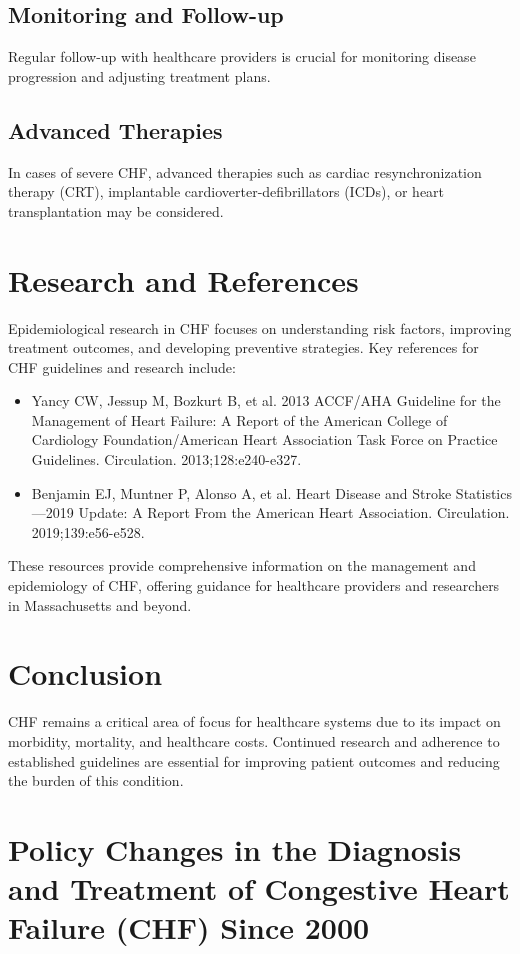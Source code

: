 \documentclass{article}
\begin{document}
\subsection{Monitoring and Follow-up}
Regular follow-up with healthcare providers is crucial for monitoring disease progression and adjusting treatment plans.

\subsection{Advanced Therapies}
In cases of severe CHF, advanced therapies such as cardiac resynchronization therapy (CRT), implantable cardioverter-defibrillators (ICDs), or heart transplantation may be considered.

\section{Research and References}
Epidemiological research in CHF focuses on understanding risk factors, improving treatment outcomes, and developing preventive strategies. Key references for CHF guidelines and research include:

\begin{itemize}
    \item Yancy CW, Jessup M, Bozkurt B, et al. 2013 ACCF/AHA Guideline for the Management of Heart Failure: A Report of the American College of Cardiology Foundation/American Heart Association Task Force on Practice Guidelines. Circulation. 2013;128:e240-e327.
    \item Benjamin EJ, Muntner P, Alonso A, et al. Heart Disease and Stroke Statistics—2019 Update: A Report From the American Heart Association. Circulation. 2019;139:e56-e528.
\end{itemize}

These resources provide comprehensive information on the management and epidemiology of CHF, offering guidance for healthcare providers and researchers in Massachusetts and beyond.

\section{Conclusion}
CHF remains a critical area of focus for healthcare systems due to its impact on morbidity, mortality, and healthcare costs. Continued research and adherence to established guidelines are essential for improving patient outcomes and reducing the burden of this condition.

\section{Policy Changes in the Diagnosis and Treatment of Congestive Heart Failure (CHF) Since 2000}
\end{document}
